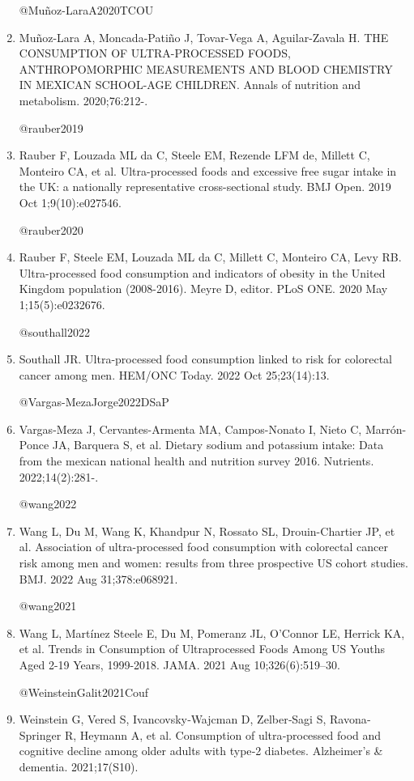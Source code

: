 \documentclass[
]{article}
\begin{document}
\begin{enumerate}
  @Muñoz-LaraA2020TCOU
\item
  Muñoz-Lara A, Moncada-Patiño J, Tovar-Vega A, Aguilar-Zavala H. THE
  CONSUMPTION OF ULTRA-PROCESSED FOODS, ANTHROPOMORPHIC MEASUREMENTS AND
  BLOOD CHEMISTRY IN MEXICAN SCHOOL-AGE CHILDREN. Annals of nutrition
  and metabolism. 2020;76:212-.

  @rauber2019
\item
  Rauber F, Louzada ML da C, Steele EM, Rezende LFM de, Millett C,
  Monteiro CA, et al. Ultra-processed foods and excessive free sugar
  intake in the UK: a nationally representative cross-sectional study.
  BMJ Open. 2019 Oct 1;9(10):e027546.

  @rauber2020
\item
  Rauber F, Steele EM, Louzada ML da C, Millett C, Monteiro CA, Levy RB.
  Ultra-processed food consumption and indicators of obesity in the
  United Kingdom population (2008-2016). Meyre D, editor. PLoS ONE. 2020
  May 1;15(5):e0232676.

  @southall2022
\item
  Southall JR. Ultra-processed food consumption linked to risk for
  colorectal cancer among men. HEM/ONC Today. 2022 Oct 25;23(14):13.

  @Vargas-MezaJorge2022DSaP
\item
  Vargas-Meza J, Cervantes-Armenta MA, Campos-Nonato I, Nieto C,
  Marrón-Ponce JA, Barquera S, et al. Dietary sodium and potassium
  intake: Data from the mexican national health and nutrition survey
  2016. Nutrients. 2022;14(2):281-.

  @wang2022
\item
  Wang L, Du M, Wang K, Khandpur N, Rossato SL, Drouin-Chartier JP, et
  al. Association of ultra-processed food consumption with colorectal
  cancer risk among men and women: results from three prospective US
  cohort studies. BMJ. 2022 Aug 31;378:e068921.

  @wang2021
\item
  Wang L, Martínez Steele E, Du M, Pomeranz JL, O'Connor LE, Herrick KA,
  et al. Trends in Consumption of Ultraprocessed Foods Among US Youths
  Aged 2-19 Years, 1999-2018. JAMA. 2021 Aug 10;326(6):519--30.

  @WeinsteinGalit2021Couf
\item
  Weinstein G, Vered S, Ivancovsky‐Wajcman D, Zelber‐Sagi S,
  Ravona‐Springer R, Heymann A, et al. Consumption of ultra‐processed
  food and cognitive decline among older adults with type‐2 diabetes.
  Alzheimer's \& dementia. 2021;17(S10).
\end{enumerate}
\end{document}
